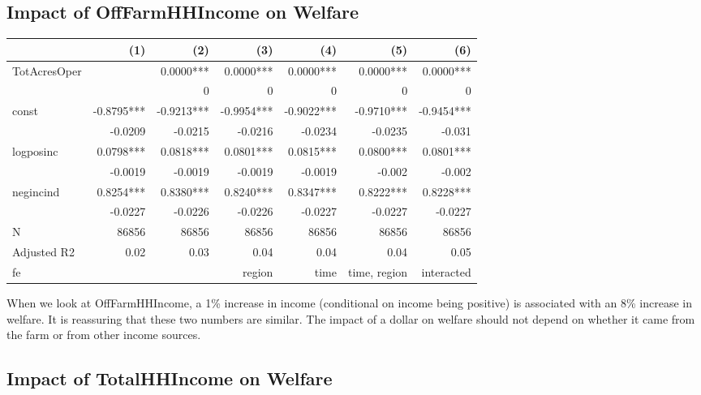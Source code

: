 \documentclass[11pt]{article}
\begin{document}
\subsection{Impact of OffFarmHHIncome on Welfare}
\label{sec:org0057a97}
\begin{center}
\begin{tabular}{lrrrrrr}
\hline
 & (1) & (2) & (3) & (4) & (5) & (6)\\[0pt]
\hline
TotAcresOper &  & 0.0000*** & 0.0000*** & 0.0000*** & 0.0000*** & 0.0000***\\[0pt]
 &  & 0 & 0 & 0 & 0 & 0\\[0pt]
const & -0.8795*** & -0.9213*** & -0.9954*** & -0.9022*** & -0.9710*** & -0.9454***\\[0pt]
 & -0.0209 & -0.0215 & -0.0216 & -0.0234 & -0.0235 & -0.031\\[0pt]
logposinc & 0.0798*** & 0.0818*** & 0.0801*** & 0.0815*** & 0.0800*** & 0.0801***\\[0pt]
 & -0.0019 & -0.0019 & -0.0019 & -0.0019 & -0.002 & -0.002\\[0pt]
negincind & 0.8254*** & 0.8380*** & 0.8240*** & 0.8347*** & 0.8222*** & 0.8228***\\[0pt]
 & -0.0227 & -0.0226 & -0.0226 & -0.0227 & -0.0227 & -0.0227\\[0pt]
N & 86856 & 86856 & 86856 & 86856 & 86856 & 86856\\[0pt]
Adjusted R2 & 0.02 & 0.03 & 0.04 & 0.04 & 0.04 & 0.05\\[0pt]
fe &  &  & region & time & time, region & interacted\\[0pt]
\end{tabular}
\end{center}

When we look at OffFarmHHIncome, a 1\% increase in income (conditional on income being positive) is associated with an 8\% increase in welfare. It is reassuring that these two numbers are similar. The impact of a dollar on welfare should not depend on whether it came from the farm or from other income sources.  
\subsection{Impact of TotalHHIncome on Welfare}
\label{sec:org1a17b0f}
\end{document}
